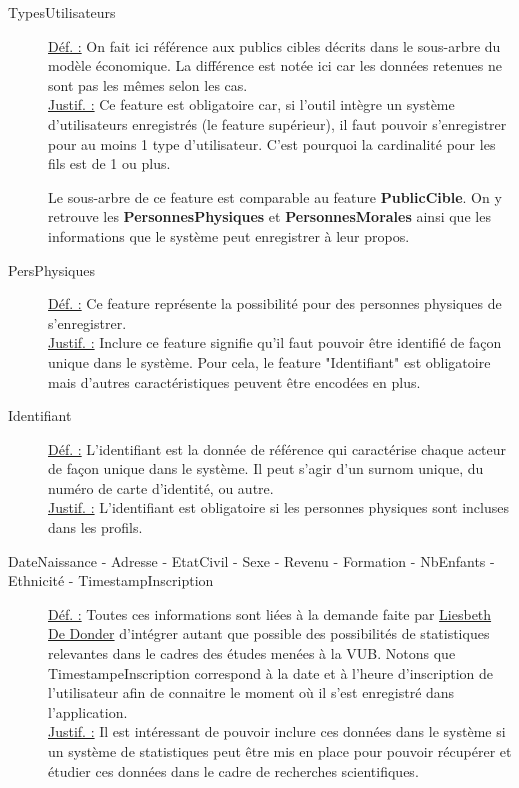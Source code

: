 \begin{description}
\item [TypesUtilisateurs]
\underline{Déf. :}  On fait ici référence aux publics cibles décrits dans le sous-arbre du modèle économique.  La différence est notée ici car les données retenues ne sont pas les mêmes selon les cas.
\\ \underline{Justif. :}  Ce feature est obligatoire car,  si l'outil intègre un système d'utilisateurs enregistrés (le feature supérieur),  il faut pouvoir s'enregistrer pour au moins 1 type d'utilisateur.   C'est pourquoi la cardinalité pour les fils est de 1 ou plus.
\newline

Le sous-arbre de ce feature est comparable au feature \textbf{PublicCible}.  On y retrouve les \textbf{PersonnesPhysiques} et \textbf{PersonnesMorales} ainsi que les informations que le système peut enregistrer à leur propos.

\item [PersPhysiques]
\underline{Déf. :}  Ce feature représente la possibilité pour des personnes physiques de s'enregistrer.  
\\ \underline{Justif. :}  Inclure ce feature signifie qu'il faut pouvoir être identifié de façon unique dans le système.  Pour cela,  le feature "Identifiant" est obligatoire mais d'autres caractéristiques peuvent être encodées en plus.  
\newline

\item [Identifiant]
\underline{Déf. :}  L'identifiant est la donnée de référence qui caractérise chaque acteur de façon unique dans le système.   Il peut s'agir d'un surnom unique,  du numéro de carte d'identité,  ou autre.
\\ \underline{Justif. :}  L'identifiant est obligatoire si les personnes physiques sont incluses dans les profils.  
\newline

\item [DateNaissance - Adresse - EtatCivil - Sexe - Revenu - Formation - NbEnfants - Ethnicité - TimestampInscription]
\underline{Déf. :}  Toutes ces informations sont liées à la demande faite par \href{http://www.vub.ac.be/EDWE/index.php?option=com_content&task=view&id=82}{Liesbeth De Donder} d'intégrer autant que possible des possibilités de statistiques relevantes dans le cadres des études menées à la VUB.  Notons que TimestampeInscription correspond à la date et à l'heure d'inscription de l'utilisateur afin de connaitre le moment où il s'est enregistré dans l'application.
\\ \underline{Justif. :}  Il est intéressant de pouvoir inclure ces données dans le système si un système de statistiques peut être mis en place pour pouvoir récupérer et étudier ces données dans le cadre de recherches scientifiques.
\newline


\end{description}

